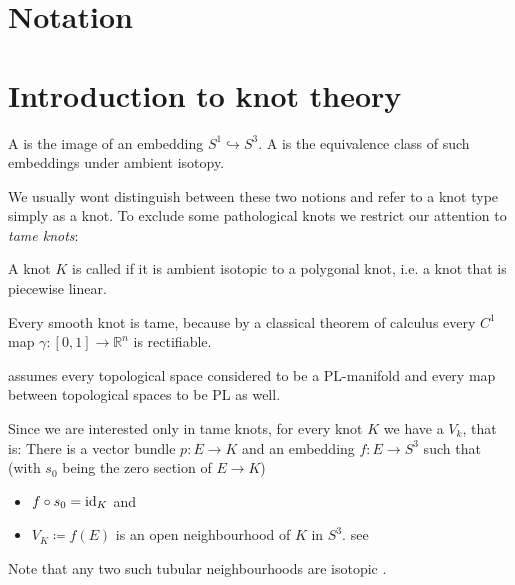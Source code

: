 





\tableofcontents

\tableofcontents
\section*{Notation}

\cleardoubleoddemptypage

\setcounter{page}{1}
\setcounter{footnote}{0}

\section{Introduction to knot theory} %
\label{sec:intro_knots}

\begin{definition}
	A  is the image of an embedding $S^1 \hookrightarrow S^3$.
	A  is the equivalence class of such embeddings under ambient isotopy. 
\end{definition}

We usually wont distinguish between these two notions and refer to a knot type simply as a knot.
To exclude some pathological knots we restrict our attention to \emph{tame knots}:

\begin{definition}
	A knot $K$ is called  if it is ambient isotopic to a polygonal knot, i.e. a knot that is piecewise linear.
\end{definition}

\begin{example}
	Every smooth knot is tame, because by a classical theorem of calculus every $C^1$ map $\gamma \colon [0,1] \to \mathbb{R}^n$ is rectifiable.
\end{example}

\textcite[p.~9]{morishita} assumes every topological space considered to be a PL-manifold and every map between topological spaces to be PL as well.

Since we are interested only in tame knots, for every knot $K$ we have a  $V_k$, that is: There is a vector bundle $p \colon E \to K$ and an embedding $f \colon E \to S^3$ such that (with $s_0$ being the zero section of $E \to K$)
\begin{itemize}
	\item $f \circ s_0 = {\operatorname{id}_K}$ and
	\item $V_K \coloneqq f(E)$ is an open neighbourhood of $K$ in $S^3$. \hfill see \textcite{hirschDifferential}
\end{itemize}
Note that any two such tubular neighbourhoods are isotopic \cite[Chap.~4, Thm.~5.3]{hirschDifferential}.

